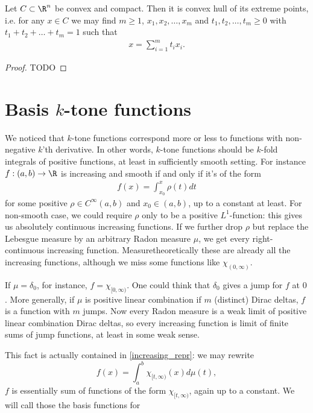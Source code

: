 \begin{lause}
	Let $C \subset \R^{n}$ be convex and compact. Then it is convex hull of its extreme points, i.e. for any $x \in C$ we may find $m \geq 1$, $x_{1}, x_{2}, \ldots, x_{m}$ and $t_{1}, t_{2}, \ldots, t_{m} \geq 0$ with $t_{1} + t_{2} + \ldots + t_{m} = 1$ such that
	\begin{align*}
		x = \sum_{i = 1}^{m} t_{i} x_{i}.
	\end{align*}
\end{lause}
\begin{proof}
	TODO
\end{proof}

\section{Basis $k$-tone functions}

We noticed that $k$-tone functions correspond more or less to functions with non-negative $k$'th derivative. In other words, $k$-tone functions should be $k$-fold integrals of positive functions, at least in sufficiently smooth setting. For instance $f : (a, b) \to \R$ is increasing and smooth if and only if it's of the form
\begin{align}\label{increasing_repr}
	f(x) = \int_{x_{0}}^{x} \rho(t) dt
\end{align}
for some positive $\rho \in C^{\infty}(a, b)$ and $x_{0} \in (a, b)$, up to a constant at least. For non-smooth case, we could require $\rho$ only to be a positive $L^{1}$-function: this gives us absolutely continuous increasing functions. If we further drop $\rho$ but replace the Lebesgue measure by an arbitrary Radon measure $\mu$, we get every right-continuous increasing function. Measuretheoretically these are already all the increasing functions, although we miss some functions like $\chi_{(0, \infty)}$.

If $\mu = \delta_{0}$, for instance, $f = \chi_{[0, \infty)}$. One could think that $\delta_{0}$ gives a jump for $f$ at $0$. More generally, if $\mu$ is positive linear combination if $m$ (distinct) Dirac deltas, $f$ is a function with $m$ jumps. Now every Radon measure is a weak limit of positive linear combination Dirac deltas, so every increasing function is limit of finite sums of jump functions, at least in some weak sense.

This fact is actually contained in \ref{increasing_repr}: we may rewrite
\[
	f(x) = \int_{a}^{b} \chi_{[t, \infty)}(x)d\mu(t),
\]
$f$ is essentially sum of functions of the form $\chi_{[t, \infty)}$, again up to a constant. We will call those the basis functions for

